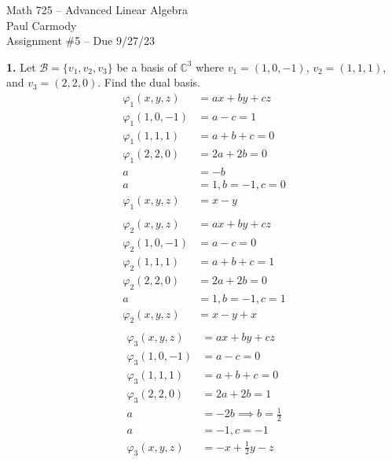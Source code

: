 \documentclass[11pt]{amsart}
\theoremstyle{definition}  %
\newcommand{\C}{\mathbb{C}}
\begin{document}
\newcommand{\MM}{\mathcal{M}}
\newcommand{\BB}{\mathcal{B}}
\newcommand{\LL}{\mathcal{L}}

\begin{center}
\Large{Math 725 -- Advanced Linear Algebra}\\
\large{Paul Carmody}\\
Assignment \#5 -- Due 9/27/23
\end{center}

\vskip 1.0cm
\noindent
{\bf 1.} Let $\mathcal{B} = \{v_1, v_2, v_3\}$ be a basis of $\C^3$ where $v_1 = (1,0,-1)$, $v_2 = (1,1,1)$, and $v_3 = (2,2,0)$. Find the dual
basis. \\
\begin{align*}
	\varphi_1(x,y,z) &= ax+by+cz \\
	\varphi_1(1,0,-1) &= a-c = 1 \\
	\varphi_1(1,1,1) &= a+b+c = 0\\
	\varphi_1(2,2,0) &= 2a+2b=0\\
	a&=-b \\
	a&= 1, b=-1, c=0\\
	\varphi_1(x,y,z) &= x-y\\
\end{align*}
\begin{align*}
	\varphi_2(x,y,z) &= ax+by+cz \\
	\varphi_2(1,0,-1) &= a-c = 0 \\
	\varphi_2(1,1,1) &= a+b+c = 1\\
	\varphi_2(2,2,0) &= 2a+2b=0 \\
	a&=1, b=-1, c=1 \\
	\varphi_2(x,y,z) &= x-y+x \\
\end{align*}
\begin{align*}
	\varphi_3(x,y,z) &= ax+by+cz \\
	\varphi_3(1,0,-1) &= a-c = 0 \\
	\varphi_3(1,1,1) &= a+b+c = 0\\
	\varphi_3(2,2,0) &= 2a+2b=1\\
	a &= -2b \implies b=\frac{1}{2} \\
	a &= -1, c = -1 \\
	\varphi_3(x,y,z) &= -x+\frac{1}{2}y-z
\end{align*}
\\
\end{document}
